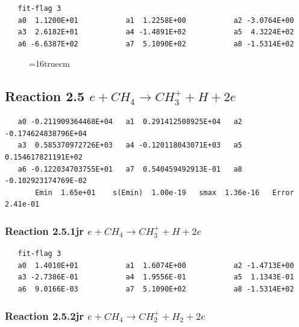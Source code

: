 \documentclass[12pt,dvipdfmx]{article}
\begin{document}
\begin{small}\begin{verbatim}
   fit-flag 3
   a0  1.1200E+01           a1  1.2258E+00           a2 -3.0764E+00
   a3  2.6182E+01           a4 -1.4891E+02           a5  4.3224E+02
   a6 -6.6387E+02           a7  5.1090E+02           a8 -1.5314E+02
\end{verbatim}\end{small}


\begin{figure} \label{met.1_2.3}
\epsfxsize=16truecm
\end{figure}
\newpage

\subsection{
Reaction 2.5       $e + CH_4 \rightarrow  CH_3^+ + H + 2e $
}

\begin{small}\begin{verbatim}
   a0 -0.211909364468E+04   a1  0.291412508925E+04   a2 -0.174624838796E+04
   a3  0.585370972726E+03   a4 -0.120118043071E+03   a5  0.154617821191E+02
   a6 -0.122034703755E+01   a7  0.540459492913E-01   a8 -0.102923174769E-02
       Emin  1.65e+01    s(Emin)  1.00e-19   smax  1.36e-16   Error  2.41e-01
\end{verbatim}\end{small}

\newpage

\subsubsection{
Reaction 2.5.1jr     $e + CH_{4} \rightarrow CH_{3}^{+} + H + 2e $
}

\begin{small}\begin{verbatim}
   fit-flag 3
   a0  1.4010E+01           a1  1.6074E+00           a2 -1.4713E+00
   a3 -2.7386E-01           a4  1.9556E-01           a5  1.1343E-01
   a6  9.0166E-03           a7  5.1090E+02           a8 -1.5314E+02
\end{verbatim}\end{small}


\subsubsection{
Reaction 2.5.2jr     $e + CH_{4} \rightarrow CH_{2}^{+} + H_{2} + 2e $
}
\end{document}
